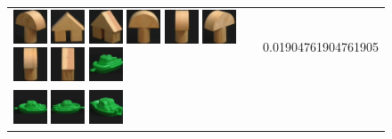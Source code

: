 \begin{figure}[tbp]
\begin{center}
\begin{tabular}{m{11cm} | m{3cm} |}
\includegraphics[width=1cm]{coil/beeld-4.eps}
\includegraphics[width=1cm]{coil/beeld-42.eps}
\includegraphics[width=1cm]{coil/beeld-46.eps}
\includegraphics[width=1cm]{coil/beeld-1.eps}
\includegraphics[width=1cm]{coil/beeld-5.eps}
\includegraphics[width=1cm]{coil/beeld-3.eps}
\includegraphics[width=1cm]{coil/beeld-2.eps}
\includegraphics[width=1cm]{coil/beeld-47.eps}
\includegraphics[width=1cm]{coil/beeld-57.eps}
& {\scriptsize 0.01904761904761905}
\\
\includegraphics[width=1cm]{coil/beeld-54.eps}
\includegraphics[width=1cm]{coil/beeld-55.eps}
\includegraphics[width=1cm]{coil/beeld-58.eps}

\end{tabular}
\end{center}
\end{figure}
